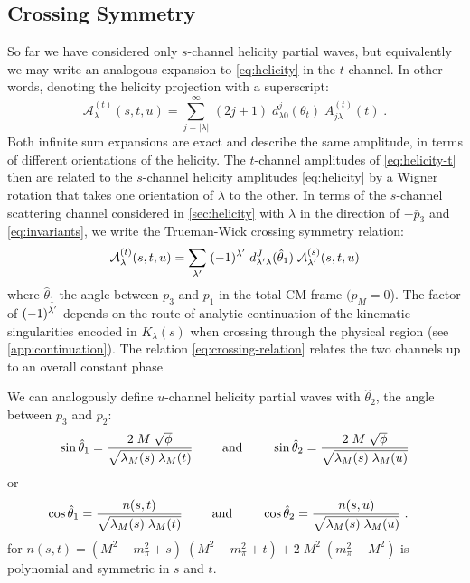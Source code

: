\subsection{Crossing Symmetry}
 So far we have considered only \(s\)-channel helicity partial waves, but equivalently we may write an analogous expansion to \cref{eq:helicity} in the \(t\)-channel. In other words, denoting the helicity projection with a superscript:
 \begin{equation}
   \label{eq:helicity-t}
   \mathcal{A}^{(t)}_\lambda(s, t, u) = \sum_{j = |\lambda|}^\infty \, (2j+1) \; d^{j}_{\lambda0}(\theta_t) \; A^{(t)}_{j\lambda}(t) \; .
 \end{equation}
Both infinite sum expansions are exact and describe the same amplitude, in terms of different orientations of the helicity. The \(t\)-channel amplitudes of \cref{eq:helicity-t} then are related to the \(s\)-channel helicity amplitudes \cref{eq:helicity} by a Wigner rotation that takes one orientation of \(\lambda\) to the other.
In terms of the \(s\)-channel scattering channel considered in \cref{sec:helicity} with \(\lambda\) in the direction of \(-\bar{p}_3\) and \cref{eq:invariants}, we write the Trueman-Wick crossing symmetry relation:
  \begin{equation}
    \label{eq:crossing-relation}
    \mathcal{A}_\lambda^{(t)}(s, t, u) = \sum_{\lambda^\prime} \;  (-1)^{\lambda^\prime} \;d_{\lambda^\prime \lambda}^J(\hat{\theta}_1) \; \mathcal{A}_{\lambda^\prime}^{(s)}(s,t,u)
  \end{equation}
where \(\hat{\theta}_1\) the angle between \(p_3\) and \(p_1\) in the total CM frame \((p_M = 0\)). The factor of \((-1)^{\lambda^\prime}\) depends on the route of analytic continuation of the kinematic singularities encoded in \(K_\lambda(s)\) when crossing through the physical region (see \cref{app:continuation}). The relation \cref{eq:crossing-relation} relates the two channels up to an overall constant phase

 We can analogously define \(u\)-channel helicity partial waves with \(\hat{\theta}_2\), the angle between \(p_3\) and \(p_2\):
  \begin{align} \label{sin-hat}
    \sin\hat{\theta}_1 = \frac{
    2 \; M \; \sqrt{\phi}
    }{
    \sqrt{\lambda_M(s) \;  \lambda_M(t)}
    }
    \qquad \text{ and } \qquad
    \sin\hat{\theta}_2 = \frac{
    2 \; M \; \sqrt{\phi}
    }{
    \sqrt{\lambda_M(s) \;  \lambda_M(u)}
    }
  \end{align}
or
  \begin{align} \label{cos-hat}
    \cos\hat{\theta}_1 &= \frac{n(s,t)}
    {\sqrt{\lambda_M(s) \; \lambda_M(t)}} \qquad \text{ and } \qquad
    \cos\hat{\theta}_2 = \frac{n(s,u)}
    {\sqrt{\lambda_M(s) \; \lambda_M(u)}} \; .
  \end{align}
for \(n(s,t) =  (M^2 - m_\pi^2 + s) \; (M^2 - m_\pi^2  + t)  + 2 \; M^2 \; (m_\pi^2 -M^2)\) is polynomial and symmetric in \(s\) and \(t\).

